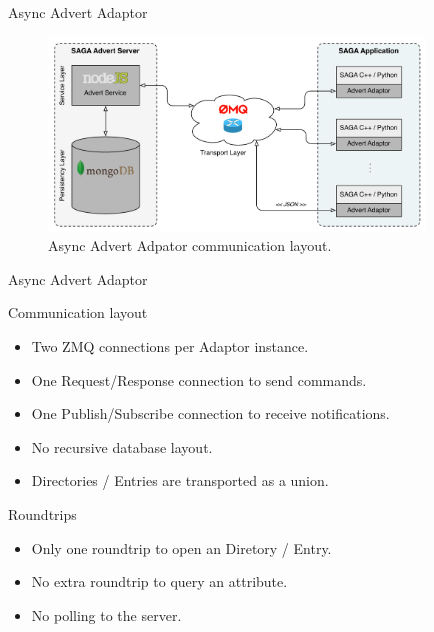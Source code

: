 \documentclass{beamer}
\begin{document}
    \begin{frame}{Async Advert Adaptor}
      \begin{figure}
        \includegraphics[width=10cm]{new_technology_overview}
        \caption{Async Advert Adpator communication layout.}  
      \end{figure}
    \end{frame}
    
    \begin{frame}{Async Advert Adaptor}
      \begin{block}{Communication layout}
        \begin{itemize}
          \item Two ZMQ connections per Adaptor instance.
          \item One Request/Response connection to send commands.
          \item One Publish/Subscribe connection to receive notifications.
          \item No recursive database layout.
          \item Directories / Entries are transported as a union.
        \end{itemize}
      \end{block}
      
      \begin{alertblock}{Roundtrips}
             \begin{itemize}
               \item Only one roundtrip to open an Diretory / Entry.
               \item No extra roundtrip to query an attribute.
               \item No polling to the server.
             \end{itemize} 
      \end{alertblock}
    \end{frame}
  
\end{document}
